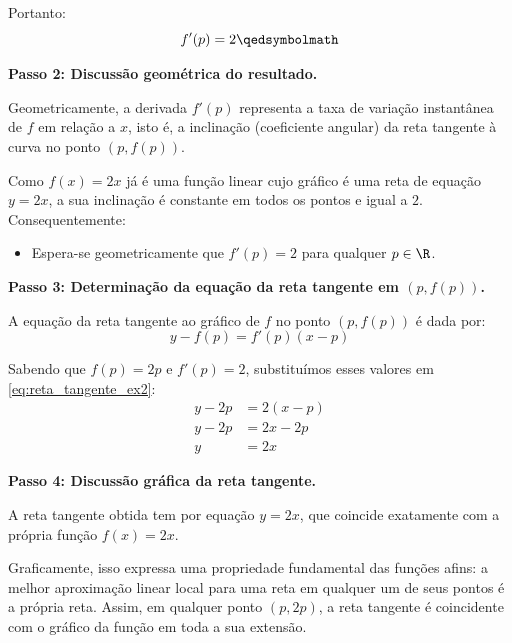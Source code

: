 Portanto:
\[
f'(p) = 2 \qedsymbolmath
\]

\vspace{0.3cm}
\textbf{Passo 2: Discussão geométrica do resultado.}

Geometricamente, a derivada $f'(p)$ representa a taxa de variação instantânea de $f$ em relação a $x$, isto é, a inclinação (coeficiente angular) da reta tangente à curva no ponto $(p, f(p))$.

Como $f(x) = 2x$ já é uma função linear cujo gráfico é uma reta de equação $y = 2x$, a sua inclinação é constante em todos os pontos e igual a $2$. Consequentemente:
\begin{itemize}[noitemsep, topsep=2pt]
    \item Espera-se geometricamente que $f'(p) = 2$ para qualquer $p \in \R$.
\end{itemize}

\vspace{0.3cm}
\textbf{Passo 3: Determinação da equação da reta tangente em $(p, f(p))$.}

A equação da reta tangente ao gráfico de $f$ no ponto $(p, f(p))$ é dada por:
\begin{equation}
    y - f(p) = f'(p)(x - p) \label{eq:reta_tangente_ex2}
\end{equation}

Sabendo que $f(p) = 2p$ e $f'(p) = 2$, substituímos esses valores em \eqref{eq:reta_tangente_ex2}:
\begin{align*}
    y - 2p &= 2(x - p) \\[0.25cm]
    y - 2p &= 2x - 2p \\[0.25cm]
    y &= 2x
\end{align*}

\vspace{0.3cm}
\textbf{Passo 4: Discussão gráfica da reta tangente.}

A reta tangente obtida tem por equação $y = 2x$, que coincide exatamente com a própria função $f(x) = 2x$.

Graficamente, isso expressa uma propriedade fundamental das funções afins: a melhor aproximação linear local para uma reta em qualquer um de seus pontos é a própria reta. Assim, em qualquer ponto $(p, 2p)$, a reta tangente é coincidente com o gráfico da função em toda a sua extensão.

